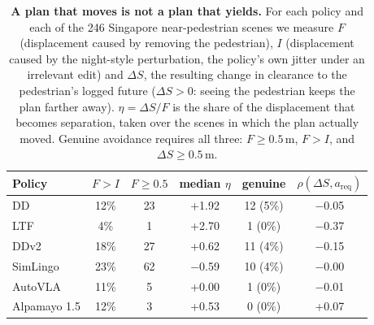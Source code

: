 \begin{table}[t]
\centering
\caption{\textbf{A plan that moves is not a plan that yields.} For each policy and each of the 246 Singapore near-pedestrian scenes we measure $F$ (displacement caused by removing the pedestrian), $I$ (displacement caused by the night-style perturbation, the policy's own jitter under an irrelevant edit) and $\Delta S$, the resulting change in clearance to the pedestrian's logged future ($\Delta S>0$: seeing the pedestrian keeps the plan farther away). $\eta=\Delta S/F$ is the share of the displacement that becomes separation, taken over the scenes in which the plan actually moved. Genuine avoidance requires all three: $F\ge0.5$\,m, $F>I$, and $\Delta S\ge0.5$\,m.}
\label{tab:decomp}
\scriptsize
\setlength{\tabcolsep}{3pt}
\begin{tabular}{@{}lccccc@{}}
\toprule
Policy & $F>I$ & $F\ge0.5$ & median $\eta$ & genuine & $\rho(\Delta S,a_{\mathrm{req}})$ \\
\midrule
DD & 12\% & 23 & +1.92 & 12 (5\%) & $-$0.05 \\
LTF & 4\% & 1 & +2.70 & 1 (0\%) & $-$0.37 \\
DDv2 & 18\% & 27 & +0.62 & 11 (4\%) & $-$0.15 \\
SimLingo & 23\% & 62 & $-$0.59 & 10 (4\%) & $-$0.00 \\
AutoVLA & 11\% & 5 & +0.00 & 1 (0\%) & $-$0.01 \\
Alpamayo 1.5 & 12\% & 3 & +0.53 & 0 (0\%) & +0.07 \\
\bottomrule
\end{tabular}
\end{table}
